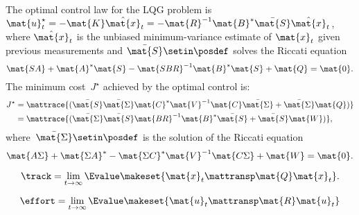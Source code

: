 {\begin{forslides}
        \begin{lemma}
            \label{lem:lqgstandard}
            The optimal control law for the LQG problem is~$\mat{u}_t^\star =-\mat{K}\hat{\mat{x}}_t=-\mat{R}^{-1}\mat{B}^*\bar{\mat{S}}\hat{\mat{x}}_t$, where $\hat{\mat{x}}_t$ is the unbiased minimum-variance estimate of $\mat{x}_t$ given previous measurements and $\bar{\mat{S}}\setin \posdef$ solves the Riccati equation
            \begin{equation}
                \label{eq:cont_ric_1}
                \mat{SA}+\mat{A}^*\mat{S}-\mat{SBR}^{-1}\mat{B}^*\mat{S}+\mat{Q}=\mat{0}.
            \end{equation}
            The minimum cost~$J^\star$ achieved by the optimal control is:
            \begin{equation}
                \label{eq:contmincost}
                \begin{aligned}
                    J^\star & =\mattrace{(\bar{\mat{S}}\bar{\mat{\Sigma}}\mat{C}^*\mat{V}^{-1}\mat{C}\bar{\mat{\Sigma}}+\bar{\mat{\Sigma}}\mat{Q})} \\
                            & =\mattrace{(\bar{\mat{\Sigma}}\bar{\mat{S}}\mat{BR}^{-1}\mat{B}^*\bar{\mat{S}}+\bar{\mat{S}}\mat{W})},
                \end{aligned}
            \end{equation}
            where~$\bar{\mat{\Sigma}}\setin \posdef$ is the solution of the Riccati equation
            \begin{equation}
                \label{eq:cont_ric_2}
                \mat{A\Sigma} + \mat{\Sigma A}^*-\mat{\Sigma C}^*\mat{V}^{-1}\mat{C\Sigma}+\mat{W}=\mat{0}.
            \end{equation}
        \end{lemma}

        \begin{equation}
            \label{eq:ptrack}
            \track=\lim_{t\to \infty}\Evalue\makeset{\mat{x}_t\mattransp \mat{Q}\mat{x}_t}.
        \end{equation}

        \begin{equation}
            \label{eq:peffort}
            \effort=\lim_{t\to \infty}\Evalue\makeset{\mat{u}_t\mattransp \mat{R} \mat{u}_t }
        \end{equation}


\end{forslides}}
